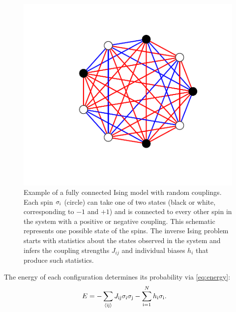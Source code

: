 \documentclass[aps,prl,twocolumn,nofootinbib]{revtex4-1}
\begin{document}
\begin{figure}[tbp]\centering
	\includegraphics[width=.85\linewidth,clip,trim={100 70 70 60}]{../images/ising_example}
\caption{Example of a fully connected Ising model with random couplings. Each spin $\sigma_{\rm i}$ (circle) can take one of two states (black or white, corresponding to $-1$ and $+1$) and is connected to every other spin in the system with a positive or negative coupling.  This schematic represents one possible state of the spins.  The inverse Ising problem starts with statistics about the states observed in the system and infers the coupling strengths $J_{ij}$ and individual biases $h_i$ that produce such statistics. }
\label{gr:ising}
\end{figure}

The energy of each configuration determines its probability via \eqref{eq:energy}:
\begin{align}
	E &= -\sum_{\rm \left<ij\right>} J_{\rm ij}\sigma_{\rm i}\sigma_{\rm j} -\sum_{\rm i=1}^Nh_{\rm i}\sigma_{\rm i}.
\end{align}
\end{document}
